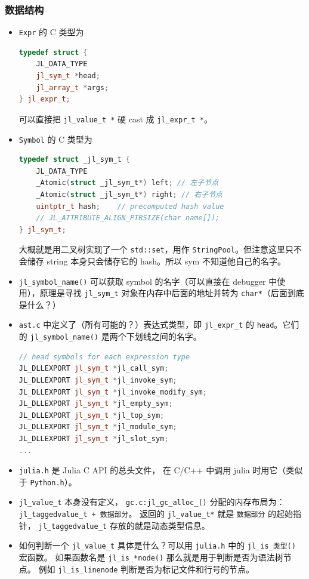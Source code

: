 \subsubsection{数据结构}
\begin{itemize}
\item \verb`Expr` 的 C 类型为
\begin{lstlisting}[language=cpp]
typedef struct {
    JL_DATA_TYPE
    jl_sym_t *head;
    jl_array_t *args;
} jl_expr_t;
\end{lstlisting}
可以直接把 \verb`jl_value_t *` 硬 cast 成 \verb`jl_expr_t *`。
\item \verb`Symbol` 的 C 类型为
\begin{lstlisting}[language=cpp]
typedef struct _jl_sym_t {
    JL_DATA_TYPE
    _Atomic(struct _jl_sym_t*) left; // 左子节点
    _Atomic(struct _jl_sym_t*) right; // 右子节点
    uintptr_t hash;    // precomputed hash value
    // JL_ATTRIBUTE_ALIGN_PTRSIZE(char name[]);
} jl_sym_t;
\end{lstlisting}
大概就是用二叉树实现了一个 \verb`std::set`，用作 \verb`StringPool`。但注意这里只不会储存 string 本身只会储存它的 hash。所以 sym 不知道他自己的名字。
\item \verb`jl_symbol_name()` 可以获取 symbol 的名字（可以直接在 debugger 中使用），原理是寻找 \verb`jl_sym_t` 对象在内存中后面的地址并转为 \verb`char*`（后面到底是什么？）
\item \verb`ast.c` 中定义了（所有可能的？）表达式类型，即 \verb`jl_expr_t` 的 \verb`head`。它们的 \verb`jl_symbol_name()` 是两个下划线之间的名字。
\begin{lstlisting}[language=cpp]
// head symbols for each expression type
JL_DLLEXPORT jl_sym_t *jl_call_sym;
JL_DLLEXPORT jl_sym_t *jl_invoke_sym;
JL_DLLEXPORT jl_sym_t *jl_invoke_modify_sym;
JL_DLLEXPORT jl_sym_t *jl_empty_sym;
JL_DLLEXPORT jl_sym_t *jl_top_sym;
JL_DLLEXPORT jl_sym_t *jl_module_sym;
JL_DLLEXPORT jl_sym_t *jl_slot_sym;
...
\end{lstlisting}
\item \verb`julia.h` 是 Julia C API 的总头文件， 在 C/C++ 中调用 julia 时用它（类似于 \verb`Python.h`）。
\item \verb`jl_value_t` 本身没有定义， \verb`gc.c:jl_gc_alloc_()` 分配的内存布局为：\verb`jl_taggedvalue_t + 数据部分`。
返回的 \verb`jl_value_t*` 就是 \verb`数据部分` 的起始指针， \verb`jl_taggedvalue_t` 存放的就是动态类型信息。
\item 如何判断一个 \verb`jl_value_t` 具体是什么？可以用 \verb`julia.h` 中的 \verb`jl_is_类型()` 宏函数。 如果函数名是 \verb`jl_is_*node()` 那么就是用于判断是否为语法树节点。 例如 \verb`jl_is_linenode` 判断是否为标记文件和行号的节点。

\end{itemize}
